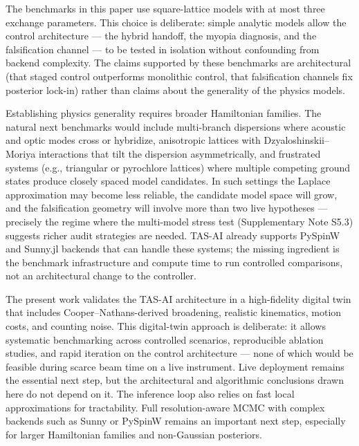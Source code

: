 \documentclass[
]{article}
\begin{document}
The benchmarks in this paper use square-lattice models with at most
three exchange parameters. This choice is deliberate: simple analytic
models allow the control architecture --- the hybrid handoff, the myopia
diagnosis, and the falsification channel --- to be tested in isolation
without confounding from backend complexity. The claims supported by
these benchmarks are architectural (that staged control outperforms
monolithic control, that falsification channels fix posterior lock-in)
rather than claims about the generality of the physics models.

Establishing physics generality requires broader Hamiltonian families.
The natural next benchmarks would include multi-branch dispersions where
acoustic and optic modes cross or hybridize, anisotropic lattices with
Dzyaloshinskii--Moriya interactions that tilt the dispersion
asymmetrically, and frustrated systems (e.g., triangular or pyrochlore
lattices) where multiple competing ground states produce closely spaced
model candidates. In such settings the Laplace approximation may become
less reliable, the candidate model space will grow, and the
falsification geometry will involve more than two live hypotheses ---
precisely the regime where the multi-model stress test (Supplementary
Note S5.3) suggests richer audit strategies are needed. TAS-AI already
supports PySpinW and Sunny.jl backends that can handle these systems;
the missing ingredient is the benchmark infrastructure and compute time
to run controlled comparisons, not an architectural change to the
controller.

The present work validates the TAS-AI architecture in a high-fidelity
digital twin that includes Cooper--Nathans-derived broadening, realistic
kinematics, motion costs, and counting noise. This digital-twin approach
is deliberate: it allows systematic benchmarking across controlled
scenarios, reproducible ablation studies, and rapid iteration on the
control architecture --- none of which would be feasible during scarce
beam time on a live instrument. Live deployment remains the essential
next step, but the architectural and algorithmic conclusions drawn here
do not depend on it. The inference loop also relies on fast local
approximations for tractability. Full resolution-aware MCMC with complex
backends such as Sunny or PySpinW remains an important next step,
especially for larger Hamiltonian families and non-Gaussian posteriors.
\end{document}
